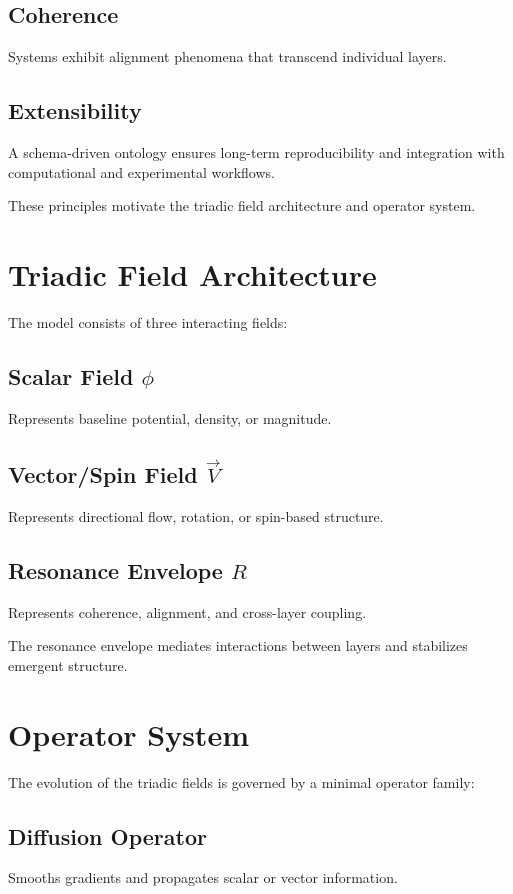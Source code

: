 \documentclass[12pt]{article}
\begin{document}
\subsection{Coherence}
Systems exhibit alignment phenomena that transcend individual layers.

\subsection{Extensibility}
A schema-driven ontology ensures long-term reproducibility and integration with computational and experimental workflows.

These principles motivate the triadic field architecture and operator system.

\section{Triadic Field Architecture}

The model consists of three interacting fields:

\subsection{Scalar Field $\phi$}
Represents baseline potential, density, or magnitude.

\subsection{Vector/Spin Field $\vec{V}$}
Represents directional flow, rotation, or spin-based structure.

\subsection{Resonance Envelope $R$}
Represents coherence, alignment, and cross-layer coupling.

The resonance envelope mediates interactions between layers and stabilizes emergent structure.

\section{Operator System}

The evolution of the triadic fields is governed by a minimal operator family:

\subsection{Diffusion Operator}
Smooths gradients and propagates scalar or vector information.
\end{document}
